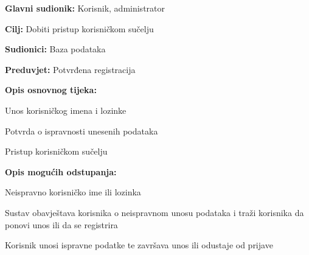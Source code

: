 					\noindent {}
					\begin{packed_item}
						
						\item \textbf{Glavni sudionik: }Korisnik, administrator
						\item  \textbf{Cilj:} Dobiti pristup korisničkom sučelju
						\item  \textbf{Sudionici:} Baza podataka
						\item  \textbf{Preduvjet:} Potvrđena registracija
						\item  \textbf{Opis osnovnog tijeka:}
						
						\item[] \begin{packed_enum}
							
							\item Unos korisničkog imena i lozinke
							\item Potvrda o ispravnosti unesenih podataka
							\item Pristup korisničkom sučelju

						\end{packed_enum}
						
						\item  \textbf{Opis mogućih odstupanja:}
						
						\item[] \begin{packed_item}
							
							\item[2.a] Neispravno korisničko ime ili lozinka
							\item[] \begin{packed_enum}

								\item Sustav obavještava korisnika o neispravnom unosu podataka i traži korisnika da ponovi unos ili da se registrira
								\item Korisnik unosi ispravne podatke te završava unos ili odustaje od prijave
								
							\end{packed_enum}
							
						\end{packed_item}
					\end{packed_item}
					
